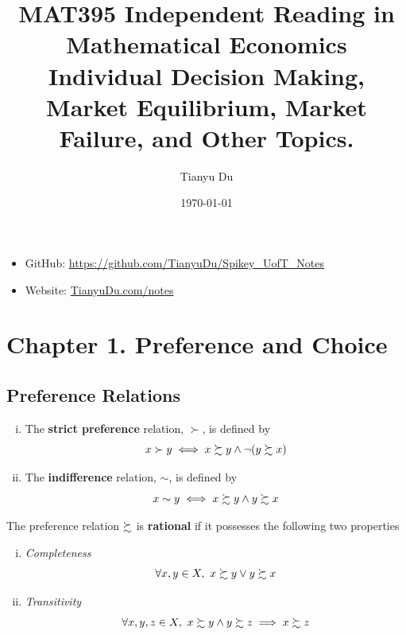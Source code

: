 \documentclass{article}
\title{MAT395 Independent Reading in Mathematical Economics\\ \small Individual Decision Making, Market Equilibrium, Market Failure, and Other Topics.}
\date{\today}
\author{Tianyu Du}
\begin{document}
	\maketitle
	\doclicenseThis
	\begin{itemize}
		\item GitHub: \url{https://github.com/TianyuDu/Spikey_UofT_Notes}
		\item Website: \url{TianyuDu.com/notes}
	\end{itemize}
	\tableofcontents
	\newpage
	
	\section{Chapter 1. Preference and Choice}
	\subsection{Preference Relations}
	
		\begin{definition} \quad
			\begin{enumerate}[(i)]
				\item The \textbf{strict preference} relation, $\succ$, is defined by
					\begin{equation}
						x \succ y \iff x \succsim y \land \neg (y \succsim x)
					\end{equation}
				\item The \textbf{indifference} relation, $\sim$, is defined by
					\begin{equation}
						x \sim y \iff x \succsim y \land y \succsim x
					\end{equation}
			\end{enumerate}
		\end{definition}
	
		\begin{definition}[1.B.1]
			The preference relation $\succsim$ is \textbf{rational} if it possesses the following two properties
			\begin{enumerate}[(i)]
				\item \emph{Completeness} 
					\begin{equation}
						\forall x, y \in X,\ x \succsim y \lor y \succsim x
					\end{equation}
				\item \emph{Transitivity}
					\begin{equation}
						\forall x, y, z \in X,\ x \succsim y \land y \succsim z \implies x \succsim z
					\end{equation}
			\end{enumerate}
		\end{definition}
	
\end{document}
